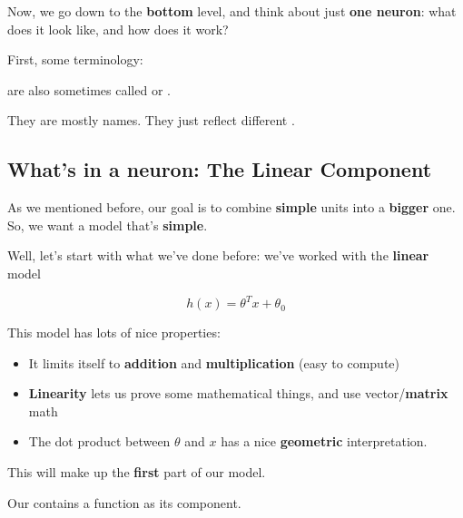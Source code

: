     Now, we go down to the \textbf{bottom} level, and think about just \textbf{one neuron}: what does it look like, and how does it work?
    
    First, some terminology:\\
    
    \begin{notation}
         are also sometimes called  or .
        
        They are mostly  names. They just reflect different .
    \end{notation}
    
    \subsection{What's in a neuron: The Linear Component}
    
        As we mentioned before, our goal is to combine \textbf{simple} units into a \textbf{bigger} one. So, we want a model that's \textbf{simple}.
        
        Well, let's start with what we've done before: we've worked with the \textbf{linear} model
        
        \begin{equation}
            h(x) = \theta^T x + \theta_0
        \end{equation}
        
        This model has lots of nice properties:
        
        \begin{itemize}
            \item It limits itself to \textbf{addition} and \textbf{multiplication} (easy to compute)
            
            \item \textbf{Linearity} lets us prove some mathematical things, and use vector/\textbf{matrix} math
            
            \item The dot product between $\theta$ and $x$ has a nice \textbf{geometric} interpretation.
        \end{itemize}
        
        This will make up the \textbf{first} part of our model.\\
        
        \begin{concept}
            Our  contains a  function as its  component.
        \end{concept}
    
